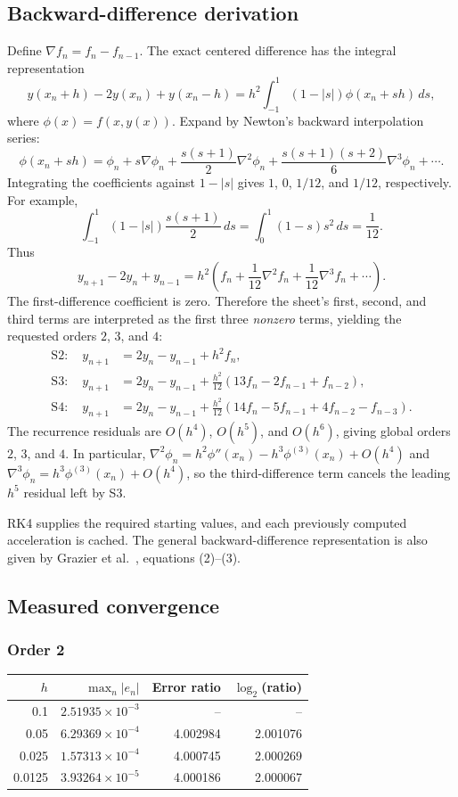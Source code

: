 \documentclass[11pt,a4paper]{article}
\begin{document}
\subsection{Backward-difference derivation}
Define $\nabla f_n=f_n-f_{n-1}$. The exact centered difference has the
integral representation
\[
y(x_n+h)-2y(x_n)+y(x_n-h)
=h^2\int_{-1}^{1}(1-|s|)\phi(x_n+sh)\,ds,
\]
where $\phi(x)=f(x,y(x))$. Expand by Newton's backward interpolation series:
\[
\phi(x_n+sh)=\phi_n+s\nabla\phi_n
+\frac{s(s+1)}{2}\nabla^2\phi_n
+\frac{s(s+1)(s+2)}{6}\nabla^3\phi_n+\cdots.
\]
Integrating the coefficients against $1-|s|$ gives $1$, $0$, $1/12$,
and $1/12$, respectively. For example,
\[
\int_{-1}^{1}(1-|s|)\frac{s(s+1)}2\,ds
=\int_0^1(1-s)s^2\,ds=\frac1{12}.
\]
Thus
\[
y_{n+1}-2y_n+y_{n-1}
=h^2\left(f_n+\frac1{12}\nabla^2f_n+\frac1{12}\nabla^3f_n+\cdots\right).
\]
The first-difference coefficient is zero. Therefore the sheet's first,
second, and third terms are interpreted as the first three \emph{nonzero}
terms, yielding the requested orders $2$, $3$, and $4$:
\begin{align}
\mathrm{S2}:\quad y_{n+1}&=2y_n-y_{n-1}+h^2f_n,\\
\mathrm{S3}:\quad y_{n+1}&=2y_n-y_{n-1}
+\frac{h^2}{12}(13f_n-2f_{n-1}+f_{n-2}),\\
\mathrm{S4}:\quad y_{n+1}&=2y_n-y_{n-1}
+\frac{h^2}{12}(14f_n-5f_{n-1}+4f_{n-2}-f_{n-3}).
\end{align}
The recurrence residuals are $O(h^4)$, $O(h^5)$, and $O(h^6)$, giving
global orders $2$, $3$, and $4$. In particular,
$\nabla^2\phi_n=h^2\phi''(x_n)-h^3\phi^{(3)}(x_n)+O(h^4)$
and $\nabla^3\phi_n=h^3\phi^{(3)}(x_n)+O(h^4)$, so the third-difference
term cancels the leading $h^5$ residual left by S3.

RK4 supplies the required starting values, and each previously computed
acceleration is cached. The general backward-difference representation is
also given by Grazier et al.~\cite{grazier}, equations (2)--(3).

\subsection{Measured convergence}

\subsubsection*{Order 2}
\begin{center}\small
\begin{tabular}{rrrr}
\toprule $h$ & $\max_n|e_n|$ & Error ratio & $\log_2$(ratio) \\ \midrule
0.1 & $2.51935\times 10^{-3}$ & -- & -- \\
0.05 & $6.29369\times 10^{-4}$ & 4.002984 & 2.001076 \\
0.025 & $1.57313\times 10^{-4}$ & 4.000745 & 2.000269 \\
0.0125 & $3.93264\times 10^{-5}$ & 4.000186 & 2.000067 \\
\bottomrule
\end{tabular}
\end{center}
\end{document}
